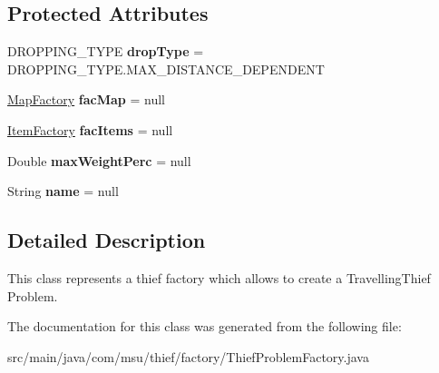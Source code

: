 \subsection*{Protected Attributes}
\begin{DoxyCompactItemize}
\item 
\hypertarget{classcom_1_1msu_1_1thief_1_1factory_1_1ThiefProblemFactory_a4d7c11f2f45909bf17ec9be46d73f8e0}{D\-R\-O\-P\-P\-I\-N\-G\-\_\-\-T\-Y\-P\-E {\bfseries drop\-Type} = D\-R\-O\-P\-P\-I\-N\-G\-\_\-\-T\-Y\-P\-E.\-M\-A\-X\-\_\-\-D\-I\-S\-T\-A\-N\-C\-E\-\_\-\-D\-E\-P\-E\-N\-D\-E\-N\-T}\label{classcom_1_1msu_1_1thief_1_1factory_1_1ThiefProblemFactory_a4d7c11f2f45909bf17ec9be46d73f8e0}

\item 
\hypertarget{classcom_1_1msu_1_1thief_1_1factory_1_1ThiefProblemFactory_a58fdea42e46e2b553ac1ca1c05feb6e9}{\hyperlink{classcom_1_1msu_1_1thief_1_1factory_1_1map_1_1MapFactory}{Map\-Factory} {\bfseries fac\-Map} = null}\label{classcom_1_1msu_1_1thief_1_1factory_1_1ThiefProblemFactory_a58fdea42e46e2b553ac1ca1c05feb6e9}

\item 
\hypertarget{classcom_1_1msu_1_1thief_1_1factory_1_1ThiefProblemFactory_a8c0d90d270932e8a2f0a34985b3b296c}{\hyperlink{classcom_1_1msu_1_1thief_1_1factory_1_1items_1_1ItemFactory}{Item\-Factory} {\bfseries fac\-Items} = null}\label{classcom_1_1msu_1_1thief_1_1factory_1_1ThiefProblemFactory_a8c0d90d270932e8a2f0a34985b3b296c}

\item 
\hypertarget{classcom_1_1msu_1_1thief_1_1factory_1_1ThiefProblemFactory_a082b34613fedf0177a74c03890528c60}{Double {\bfseries max\-Weight\-Perc} = null}\label{classcom_1_1msu_1_1thief_1_1factory_1_1ThiefProblemFactory_a082b34613fedf0177a74c03890528c60}

\item 
\hypertarget{classcom_1_1msu_1_1thief_1_1factory_1_1ThiefProblemFactory_a9803d3e81e6954b576727b7c8e8870f2}{String {\bfseries name} = null}\label{classcom_1_1msu_1_1thief_1_1factory_1_1ThiefProblemFactory_a9803d3e81e6954b576727b7c8e8870f2}

\end{DoxyCompactItemize}


\subsection{Detailed Description}
This class represents a thief factory which allows to create a Travelling\-Thief Problem. 

The documentation for this class was generated from the following file\-:\begin{DoxyCompactItemize}
\item 
src/main/java/com/msu/thief/factory/Thief\-Problem\-Factory.\-java\end{DoxyCompactItemize}
